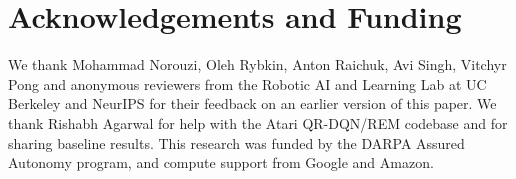 \documentclass[../thesis.tex]{subfiles}
\begin{document}
\section*{Acknowledgements and Funding}
We thank Mohammad Norouzi, Oleh Rybkin, Anton Raichuk, Avi Singh, Vitchyr Pong and anonymous reviewers from the Robotic AI and Learning Lab at UC Berkeley and NeurIPS for their feedback on an earlier version of this paper. We thank Rishabh Agarwal for help with the Atari QR-DQN/REM codebase and for sharing baseline results. This research was funded by the DARPA Assured Autonomy program, and compute support from Google and Amazon.
\end{document}
